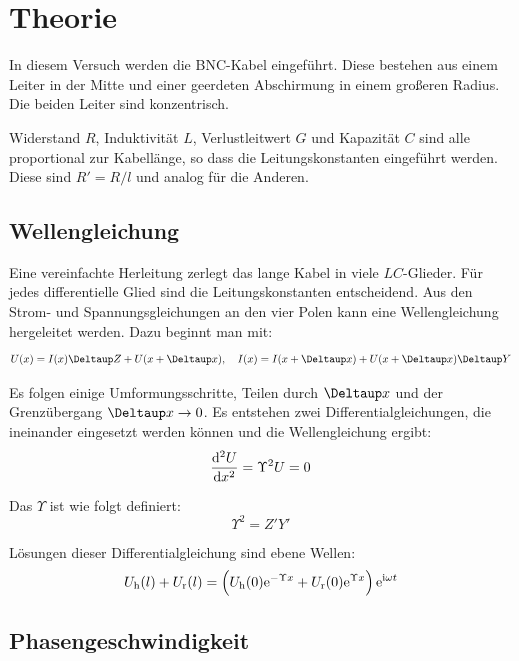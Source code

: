 
\newcommand\Uh{U_\text h}
\newcommand\Ur{U_\text r}

\section{Theorie}

In diesem Versuch werden die BNC-Kabel eingeführt. Diese bestehen aus einem
Leiter in der Mitte und einer geerdeten Abschirmung in einem großeren Radius.
Die beiden Leiter sind konzentrisch.

Widerstand $R$, Induktivität $L$, Verlustleitwert $G$ und Kapazität $C$ sind
alle proportional zur Kabellänge, so dass die Leitungskonstanten eingeführt
werden. Diese sind $R' = R/l$ und analog für die Anderen.

\subsection{Wellengleichung}

Eine vereinfachte Herleitung zerlegt das lange Kabel in viele $LC$-Glieder. Für
jedes differentielle Glied sind die Leitungskonstanten entscheidend. Aus den
Strom- und Spannungsgleichungen an den vier Polen kann eine Wellengleichung
hergeleitet werden. Dazu beginnt man mit:
\[
	U(x) = I(x) \Deltaup Z + U(x + \Deltaup x)
	\eqnsep
	I(x) = I(x + \Deltaup x) + U(x + \Deltaup x) \Deltaup Y
\]

Es folgen einige Umformungsschritte, Teilen durch $\Deltaup x$ und der
Grenzübergang $\Deltaup x \to 0$. Es entstehen zwei Differentialgleichungen,
die ineinander eingesetzt werden können und die Wellengleichung ergibt:
\[
	\dod[2] Ux = \Upsilon^2 U = 0
\]

Das $\Upsilon$ ist wie folgt definiert:
\begin{equation}
	\label{eq:1.6}
	\Upsilon^2 = Z' Y'
\end{equation}

Lösungen dieser Differentialgleichung sind ebene Wellen:
\begin{equation}
	\label{eq:1.7}
	\Uh(l) + \Ur(l)
	= \del{\Uh(0) \eup^{-\Upsilon x} + \Ur(0) \eup^{\Upsilon x}} \eup^{\iup \omega t}
\end{equation}

\subsection{Phasengeschwindigkeit}

